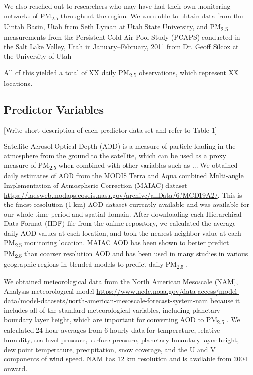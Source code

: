 \documentclass[english]{article}
\begin{document}
We also reached out to researchers who may have had their own monitoring networks of PM\textsubscript{2.5} throughout the region. We were able to obtain data from the Uintah Basin, Utah from Seth Lyman at Utah State University, and PM\textsubscript{2.5} measurements from the Persistent Cold Air Pool Study (PCAPS) \cite{Silcox_wintertime_2012} conducted in the Salt Lake Valley, Utah in January--February, 2011 from Dr. Geoff Silcox at the University of Utah.  

All of this yielded a total of XX daily PM\textsubscript{2.5} observations, which represent XX locations. %

\subsection*{Predictor Variables}

[Write short description of each predictor data set and refer to Table 1]

Satellite Aerosol Optical Depth (AOD) is a measure of particle loading in the atmosphere from the ground to the satellite, which can be used as a proxy measure of PM\textsubscript{2.5} when combined with other variables such as ... We obtained daily estimates of %
AOD from the MODIS Terra and Aqua combined Multi-angle Implementation of Atmospheric Correction (MAIAC) dataset \url{https://ladsweb.modaps.eosdis.nasa.gov/archive/allData/6/MCD19A2/}. This is the finest resolution (1 km) AOD dataset currently available and was available for our whole time period and spatial domain. After downloading each 
Hierarchical Data Format 
(HDF) file from the online repository, we calculated the average daily AOD values at each location, and took the nearest neighbor value at each PM\textsubscript{2.5} monitoring location. MAIAC AOD has been shown to better predict PM\textsubscript{2.5} than coarser resolution AOD \cite{chudnovsky_spatial_2012} and has been used in many studies in various geographic regions in blended models to predict daily PM\textsubscript{2.5} \cite{lee_benefits_2019, geng_satellite-based_2018-1, li_using_2018}.

We obtained meteorological data from the North American Mesoscale (NAM), Analysis meteorological model \url{https://www.ncdc.noaa.gov/data-access/model-data/model-datasets/north-american-mesoscale-forecast-system-nam} because it includes all of the standard meteorological variables, including planetary boundary layer height, which are important for converting AOD to PM\textsubscript{2.5} \cite{liu_estimating_2005}. We calculated 24-hour averages from 6-hourly data for temperature, relative humidity, sea level pressure, surface pressure, planetary boundary layer height, dew point temperature, precipitation, snow coverage, and the U and V components of wind speed. NAM has 12 km resolution and is available from 2004 onward.
\end{document}
